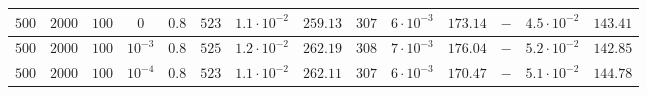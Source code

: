 \documentclass[twocolumn]{svjour3}
\begin{document}
\begin{table*} [!htp]
\begin{center}
\begin{tabular}{|c|c|c|c|c|c|c|c|c|c|c|c|c|c}
\hline
\multicolumn{1}{c}{$500$} & \multicolumn{1}{c}{$2000$} & \multicolumn{1}{c}{$100$} & \multicolumn{1}{c|}{$0$} & $ 0.8 $ & 
\multicolumn{1}{|c}{$523$} & \multicolumn{1}{c}{$1.1\cdot 10^{-2}$} & \multicolumn{1}{c|}{$259.13$} &
\multicolumn{1}{|c}{$307$} & \multicolumn{1}{c}{$6\cdot 10^{-3}$} & \multicolumn{1}{c|}{$173.14$} &
\multicolumn{1}{|c}{$-$} & \multicolumn{1}{c}{$4.5\cdot 10^{-2}$} & \multicolumn{1}{c}{$143.41$} \\
\hline
\multicolumn{1}{c}{$500$} & \multicolumn{1}{c}{$2000$} & \multicolumn{1}{c}{$100$} & \multicolumn{1}{c|}{$10^{-3}$} & $ 0.8 $ & 
\multicolumn{1}{|c}{$525$} & \multicolumn{1}{c}{$1.2\cdot 10^{-2}$} & \multicolumn{1}{c|}{$262.19$} &
\multicolumn{1}{|c}{$308$} & \multicolumn{1}{c}{$7\cdot 10^{-3}$} & \multicolumn{1}{c|}{$176.04$} &
\multicolumn{1}{|c}{$-$} & \multicolumn{1}{c}{$5.2\cdot 10^{-2}$} & \multicolumn{1}{c}{$142.85$} \\
\hline
\multicolumn{1}{c}{$500$} & \multicolumn{1}{c}{$2000$} & \multicolumn{1}{c}{$100$} & \multicolumn{1}{c|}{$10^{-4}$} & $ 0.8 $ & 
\multicolumn{1}{|c}{$523$} & \multicolumn{1}{c}{$1.1\cdot 10^{-2}$} & \multicolumn{1}{c|}{$262.11$} &
\multicolumn{1}{|c}{$307$} & \multicolumn{1}{c}{$6\cdot 10^{-3}$} & \multicolumn{1}{c|}{$170.47$} &
\multicolumn{1}{|c}{$-$} & \multicolumn{1}{c}{$5.1\cdot 10^{-2}$} & \multicolumn{1}{c}{$144.78$} \\
\hline \hline \hline


\end{tabular}
\end{center}
\end{table*}
\end{document}
